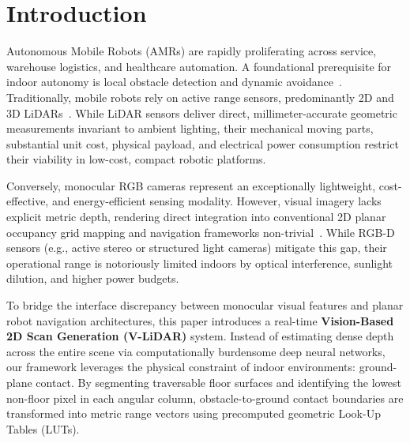 \section{Introduction}

Autonomous Mobile Robots (AMRs) are rapidly proliferating across service, warehouse logistics, and healthcare automation. A foundational prerequisite for indoor autonomy is local obstacle detection and dynamic avoidance~\cite{liu2024review}. Traditionally, mobile robots rely on active range sensors, predominantly 2D and 3D LiDARs~\cite{li2020lidar}. While LiDAR sensors deliver direct, millimeter-accurate geometric measurements invariant to ambient lighting, their mechanical moving parts, substantial unit cost, physical payload, and electrical power consumption restrict their viability in low-cost, compact robotic platforms.

Conversely, monocular RGB cameras represent an exceptionally lightweight, cost-effective, and energy-efficient sensing modality. However, visual imagery lacks explicit metric depth, rendering direct integration into conventional 2D planar occupancy grid mapping and navigation frameworks non-trivial~\cite{thrun2010probabilistic, elfes1989using}. While RGB-D sensors (e.g., active stereo or structured light cameras) mitigate this gap, their operational range is notoriously limited indoors by optical interference, sunlight dilution, and higher power budgets.

To bridge the interface discrepancy between monocular visual features and planar robot navigation architectures, this paper introduces a real-time \textbf{Vision-Based 2D Scan Generation (V-LiDAR)} system. Instead of estimating dense depth across the entire scene via computationally burdensome deep neural networks, our framework leverages the physical constraint of indoor environments: ground-plane contact. By segmenting traversable floor surfaces and identifying the lowest non-floor pixel in each angular column, obstacle-to-ground contact boundaries are transformed into metric range vectors using precomputed geometric Look-Up Tables (LUTs).

